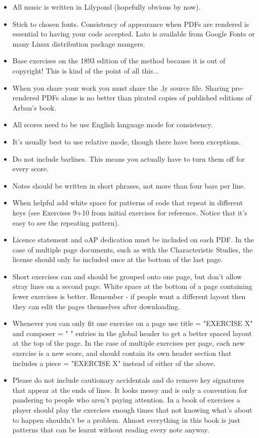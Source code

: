 \documentclass[12pt,a4paper]{article}
\begin{document}
\begin{itemize}
\item All music is written in Lilypond (hopefully obvious by now).
\item Stick to chosen fonts. Consistency of appearance when PDFs are rendered is essential to having your code accepted. Lato is available from Google Fonts or many Linux distribution package mangers.
\item Base exercises on the 1893 edition of the method because it is out of copyright! This is kind of the point of all this...
\item When you share your work you must share the .ly source file. Sharing pre-rendered PDFs alone is no better than pirated copies of published editions of Arban's book.
\item All scores need to be use English language mode for consistency.
\item It's usually best to use relative mode, though there have been exceptions.
\item Do not include barlines. This means you actually have to turn them off for every score.
\item Notes should be written in short phrases, not more than four bars per line.
\item When helpful add white space for patterns of code that repeat in different keys (see Exercises 9+10 from initial exercises for reference. Notice that it's easy to see the repeating pattern).
\item Licence statement and oAP dedication must be included on each PDF. In the case of multiple page documents, such as with the Characteristic Studies, the license should only be included once at the bottom of the last page.
\item Short exercises can and should be grouped onto one page, but don't allow stray lines on a second page. White space at the bottom of a page containing fewer exercises is better. Remember - if people want a different layout then they can edit the pages themselves after downloading.
\item Whenever you can only fit one exercise on a page use title = "EXERCISE X" and composer = " " entries in the global header to get a better spaced layout at the top of the page. In the case of multiple exercises per page, each new exercise is a new score, and should contain its own header section that includes a piece = "EXERCISE X" instead of either of the above.
\item Please do not include cautionary accidentals and do remove key signatures that appear at the ends of lines. It looks messy and is only a convention for pandering to people who aren't paying attention. In a book of exercises a player should play the exercises enough times that not knowing what's about to happen shouldn't be a problem. Almost everything in this book is just patterns that can be learnt without reading every note anyway.

\end{itemize}
\end{document}
